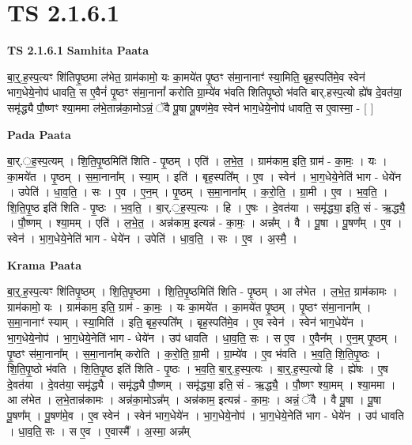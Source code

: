 \documentclass[17pt]{extarticle}
\begin{document}
\section*{ TS 2.1.6.1 }

\textbf{TS 2.1.6.1 } \newline
\textbf{Samhita Paata} \newline

बा॒र्॒.ह॒स्प॒त्यꣳ शि॑तिपृ॒ष्ठमा ल॑भेत॒ ग्राम॑कामो॒ यः का॒मये॑त पृ॒ष्ठꣳ स॑मा॒नानाꣳ॑ स्या॒मिति॒ बृह॒स्पति॑मे॒व स्वेन॑ भाग॒धेये॒नोप॑ धावति॒ स ए॒वैनं॑ पृ॒ष्ठꣳ स॑मा॒नानां᳚ करोति ग्रा॒म्ये॑व भ॑वति शितिपृ॒ष्ठो भ॑वति बार्.हस्प॒त्यो ह्ये॑ष दे॒वत॑या॒ समृ॑द्ध्यै पौ॒ष्णꣳ श्या॒ममा ल॑भे॒तान्न॑का॒मोऽन्नं॒ ॅवै पू॒षा पू॒षण॑मे॒व स्वेन॑ भाग॒धेये॒नोप॑ धावति॒ स ए॒वास्मा॒ - [  ] \newline

\textbf{Pada Paata} \newline

बा॒र्.॒ह॒स्प॒त्यम् । शि॒ति॒पृ॒ष्ठमिति॑ शिति - पृ॒ष्ठम् । एति॑ । ल॒भे॒त॒ । ग्राम॑काम॒ इति॒ ग्राम॑ - का॒मः॒ । यः । का॒मये॑त । पृ॒ष्ठम् । स॒मा॒नाना᳚म् । स्या॒म् । इति॑ । बृह॒स्पति᳚म् । ए॒व । स्वेन॑ । भा॒ग॒धेये॒नेति॑ भाग - धेये॑न । उपेति॑ । धा॒व॒ति॒ । सः । ए॒व । ए॒न॒म् । पृ॒ष्ठम् । स॒मा॒नाना᳚म् । क॒रो॒ति॒ । ग्रा॒मी । ए॒व । भ॒व॒ति॒ । शि॒ति॒पृ॒ष्ठ इति॑ शिति - पृ॒ष्ठः । भ॒व॒ति॒ । बा॒र्.॒ह॒स्प॒त्यः । हि । ए॒षः । दे॒वत॑या । समृ॑द्ध्या॒ इति॒ सं - ऋ॒द्ध्यै॒ । पौ॒ष्णम् । श्या॒मम् । एति॑ । ल॒भे॒त॒ । अन्न॑काम॒ इत्यन्न॑ - का॒मः॒ । अन्न᳚म् । वै । पू॒षा । पू॒षण᳚म् । ए॒व । स्वेन॑ । भा॒ग॒धेये॒नेति॑ भाग - धेये॑न । उपेति॑ । धा॒व॒ति॒ । सः । ए॒व । अ॒स्मै॒ ।  \newline


\textbf{Krama Paata} \newline

बा॒र्॒.ह॒स्प॒त्यꣳ शि॑तिपृ॒ष्ठम् । शि॒ति॒पृ॒ष्ठमा । शि॒ति॒पृ॒ष्ठमिति॑ शिति - पृ॒ष्ठम् । आ ल॑भेत । ल॒भे॒त॒ ग्राम॑कामः । ग्राम॑कामो॒ यः । ग्राम॑काम॒ इति॒ ग्राम॑ - का॒मः॒ । यः का॒मये॑त । का॒मये॑त पृ॒ष्ठम् । पृ॒ष्ठꣳ स॑मा॒नाना᳚म् । स॒मा॒नानाꣳ॑ स्याम् । स्या॒मिति॑ । इति॒ बृह॒स्पति᳚म् । बृह॒स्पति॑मे॒व । ए॒व स्वेन॑ । स्वेन॑ भाग॒धेये॑न । भा॒ग॒धेये॒नोप॑ । भा॒ग॒धेये॒नेति॑ भाग - धेये॑न । उप॑ धावति । धा॒व॒ति॒ सः । स ए॒व । ए॒वैन᳚म् । ए॒न॒म् पृ॒ष्ठम् । पृ॒ष्ठꣳ स॑मा॒नाना᳚म् । स॒मा॒नाना᳚म् करोति । क॒रो॒ति॒ ग्रा॒मी । ग्रा॒म्ये॑व । ए॒व भ॑वति । भ॒व॒ति॒ शि॒ति॒पृ॒ष्ठः । शि॒ति॒पृ॒ष्ठो भ॑वति । शि॒ति॒पृ॒ष्ठ इति॑ शिति - पृ॒ष्ठः । भ॒व॒ति॒ बा॒र्॒.ह॒स्प॒त्यः । बा॒र्॒.ह॒स्प॒त्यो हि । ह्ये॑षः । ए॒ष दे॒वत॑या । दे॒वत॑या॒ समृ॑द्ध्यै । समृ॑द्ध्यै पौ॒ष्णम् । समृ॑द्ध्या॒ इति॒ सं - ऋ॒द्ध्यै॒ । पौ॒ष्णꣳ श्या॒मम् । श्या॒ममा । आ ल॑भेत । ल॒भे॒तान्न॑कामः । अन्न॑का॒मोऽन्न᳚म् । अन्न॑काम॒ इत्यन्न॑ - का॒मः॒ । अन्नं॒ ॅवै । वै पू॒षा । पू॒षा पू॒षण᳚म् । पू॒षण॑मे॒व । ए॒व स्वेन॑ । स्वेन॑ भाग॒धेये॑न । भा॒ग॒धेये॒नोप॑ । भा॒ग॒धेये॒नेति॑ भाग - धेये॑न । उप॑ धावति । धा॒व॒ति॒ सः । स ए॒व । ए॒वास्मै᳚ । अ॒स्मा॒ अन्न᳚म् \newline
\end{document}
